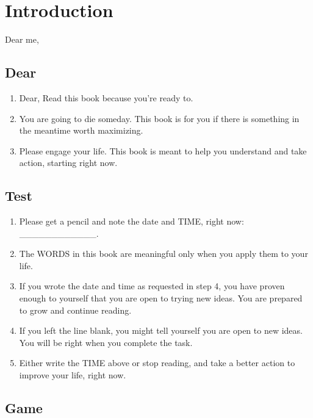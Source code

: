 \documentclass[
]{book}
\providecommand{\tightlist}{%
  \setlength{\itemsep}{0pt}\setlength{\parskip}{0pt}}
\begin{document}
\hypertarget{introduction}{%
\chapter*{Introduction}\label{introduction}}

Dear me,

\hypertarget{dear}{%
\section{Dear}\label{dear}}

\begin{enumerate}
\def\labelenumi{\arabic{enumi}.}
\tightlist
\item
  Dear, Read this book because you're ready to.
\item
  You are going to die someday. This book is for you if there is something in the meantime worth maximizing.
\item
  Please engage your life. This book is meant to help you understand and take action, starting right now.
\end{enumerate}

\hypertarget{test}{%
\section{Test}\label{test}}

\begin{enumerate}
\def\labelenumi{\arabic{enumi}.}
\setcounter{enumi}{3}
\tightlist
\item
  Please get a pencil and note the date and TIME, right now: \_\_\_\_\_\_\_\_\_\_\_\_.
\item
  The WORDS in this book are meaningful only when you apply them to your life.
\item
  If you wrote the date and time as requested in step 4, you have proven enough to yourself that you are open to trying new ideas. You are prepared to grow and continue reading.
\item
  If you left the line blank, you might tell yourself you are open to new ideas. You will be right when you complete the task.
\item
  Either write the TIME above or stop reading, and take a better action to improve your life, right now.
\end{enumerate}

\hypertarget{game}{%
\section{Game}\label{game}}
\end{document}
